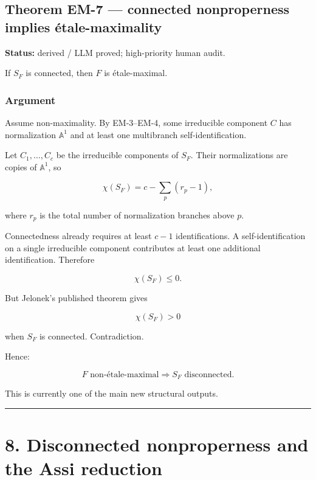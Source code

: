 \subsection{Theorem EM-7 --- connected nonproperness implies
étale-maximality}\label{theorem-em-7-connected-nonproperness-implies-uxe9tale-maximality}

\textbf{Status:} derived / LLM proved; high-priority human audit.

If \(S_F\) is connected, then \(F\) is étale-maximal.

\subsubsection{Argument}\label{argument}

Assume non-maximality. By EM-3--EM-4, some irreducible component \(C\)
has normalization \(\mathbb A^1\) and at least one multibranch
self-identification.

Let \(C_1,\ldots,C_c\) be the irreducible components of \(S_F\). Their
normalizations are copies of \(\mathbb A^1\), so

\[
\chi(S_F)
=
c-\sum_{p}(r_p-1),
\]

where \(r_p\) is the total number of normalization branches above \(p\).

Connectedness already requires at least \(c-1\) identifications. A
self-identification on a single irreducible component contributes at
least one additional identification. Therefore

\[
\chi(S_F)\le0.
\]

But Jelonek's published theorem gives

\[
\chi(S_F)>0
\]

when \(S_F\) is connected. Contradiction.

Hence:

\[
\boxed{
F\text{ non-étale-maximal}
\Longrightarrow
S_F\text{ disconnected}.
}
\]

This is currently one of the main new structural outputs.

\begin{center}\rule{0.5\linewidth}{0.5pt}\end{center}

\section{8. Disconnected nonproperness and the Assi
reduction}\label{disconnected-nonproperness-and-the-assi-reduction}

